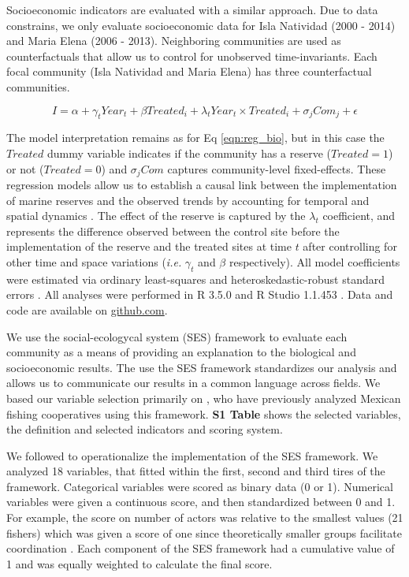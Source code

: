 \documentclass{frontiersSCNS}
\theoremstyle{definition}
\theoremstyle{definition}
\theoremstyle{definition}
\theoremstyle{remark}
\begin{document}
Socioeconomic indicators are evaluated with a similar approach. Due to
data constrains, we only evaluate socioeconomic data for Isla Natividad
(2000 - 2014) and Maria Elena (2006 - 2013). Neighboring communities are
used as counterfactuals that allow us to control for unobserved
time-invariants. Each focal community (Isla Natividad and Maria Elena)
has three counterfactual communities.

\begin{equation}
I = \alpha + \gamma_{t} Year_t + \beta Treated_i + \lambda_{t} Year_t\times Treated_i + \sigma_jCom_j +\epsilon
\label{eqn:soc_reg}
\end{equation}

The model interpretation remains as for Eq \ref{eqn:reg_bio}, but in
this case the \(Treated\) dummy variable indicates if the community has
a reserve (\(Treated = 1\)) or not (\(Treated = 0\)) and \(\sigma_jCom\)
captures community-level fixed-effects. These regression models allow us
to establish a causal link between the implementation of marine reserves
and the observed trends by accounting for temporal and spatial dynamics
\citep{depalma_2018}. The effect of the reserve is captured by the
\(\lambda_t\) coefficient, and represents the difference observed
between the control site before the implementation of the reserve and
the treated sites at time \(t\) after controlling for other time and
space variations (\emph{i.e.} \(\gamma_t\) and \(\beta\) respectively).
All model coefficients were estimated via ordinary least-squares and
heteroskedastic-robust standard errors \citep{zeileis_2004-7n}. All
analyses were performed in R 3.5.0 and R Studio 1.1.453 \citep{R_2018}.
Data and code are available on
\href{https://github.com/jcvdav/ReserveEffect}{github.com}.

We use the social-ecologycal system (SES) framework to evaluate each
community as a means of providing an explanation to the biological and
socioeconomic results. The use the SES framework standardizes our
analysis and allows us to communicate our results in a common language
across fields. We based our variable selection primarily on
\citet{leslie_2015-na,basurto_2013-oq}, who have previously analyzed
Mexican fishing cooperatives using this framework. \textbf{S1 Table}
shows the selected variables, the definition and selected indicators and
scoring system.

We followed \citet{leslie_2015-na} to operationalize the implementation
of the SES framework. We analyzed 18 variables, that fitted within the
first, second and third tires of the framework. Categorical variables
were scored as binary data (0 or 1). Numerical variables were given a
continuous score, and then standardized between 0 and 1. For example,
the score on number of actors was relative to the smallest values (21
fishers) which was given a score of one since theoretically smaller
groups facilitate coordination \citep{viana_2018}. Each component of the
SES framework had a cumulative value of 1 and was equally weighted to
calculate the final score.
\end{document}
